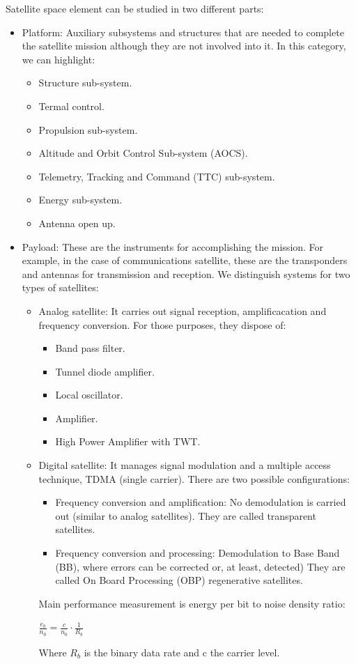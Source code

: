 \documentclass[
	12pt,
	twoside
]{book}
\begin{document}
Satellite space element can be studied in two different parts:
\begin{itemize}
	\item {
		Platform: Auxiliary subsystems and structures that are needed to complete the satellite mission although they are not involved into it. In this category, we can highlight:
		\begin{itemize}
			\item Structure sub-system.
			\item Termal control.
			\item Propulsion sub-system.
			\item Altitude and Orbit Control Sub-system (AOCS).
			\item Telemetry, Tracking and Command (TTC) sub-system.
			\item Energy sub-system.
			\item Antenna open up.
		\end{itemize}
	}
	\item {
		Payload: These are the instruments for accomplishing the mission. For example, in the case of communications satellite, these are the transponders and antennas for transmission and reception. We distinguish systems for two types of satellites:
		\begin{itemize}
			\item {
				Analog satellite: It carries out signal reception, amplificacation and frequency conversion. For those purposes, they dispose of:
				\begin{itemize}
					\item Band pass filter.
					\item Tunnel diode amplifier.
					\item Local oscillator.
					\item Amplifier.
					\item High Power Amplifier with TWT.
				\end{itemize}
			}
			\item {
				Digital satellite: It manages signal modulation and a multiple access technique, TDMA (single carrier). There are two possible configurations:
				\begin{itemize}
					\item Frequency conversion and amplification: No demodulation  is carried out (similar to analog satellites). They are called transparent satellites.
					\item Frequency conversion and processing: Demodulation to Base Band (BB), where errors can be corrected or, at least, detected) They are called On Board Processing (OBP) regenerative satellites.
				\end{itemize}
				Main performance measurement is energy per bit to noise density ratio:

				$\frac {e_b} {n_0} = \frac {c} {n_0} \cdot \frac {1} {R_b}$

				Where $R_b$ is the binary data rate and c the carrier level.
			}
		\end{itemize}
	}
\end{itemize}
\end{document}
